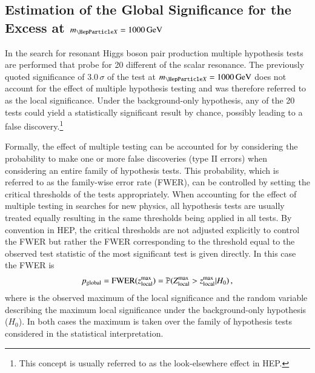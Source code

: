 

\subsection{Estimation of the Global Significance for the Excess at
  $\mX = \SI{1000}{\GeV}$}%
\label{sec:global_significance}


In the search for resonant Higgs boson pair production multiple hypothesis tests
are performed that probe for 20 different \mX of the scalar resonance. The
previously quoted significance of $3.0\,\sigma$ of the test at
$\mX = \SI{1000}{\GeV}$ does not account for the effect of multiple hypothesis
testing and was therefore referred to as the local significance. Under the
background-only hypothesis, any of the 20 tests could yield a statistically
significant result by chance, possibly leading to a false
discovery.\footnote{This concept is usually referred to as the look-elsewhere
  effect in HEP.}

Formally, the effect of multiple testing can be accounted for by considering the
probability to make one or more false discoveries (type II errors) when
considering an entire family of hypothesis tests.
This probability, which is referred to as the family-wise error rate (FWER), can
be controlled by setting the critical thresholds of the tests
appropriately. When accounting for the effect of multiple testing in searches
for new physics, all hypothesis tests are usually treated equally resulting in
the same thresholds being applied in all tests. By convention in HEP, the
critical thresholds are not adjusted explicitly to control the FWER but rather
the FWER corresponding to the threshold equal to the observed test statistic of
the most significant test is given directly. In this case the FWER is
\begin{align*}
  p_{\text{global}} = \text{FWER}(z_{\text{local}}^{\text{max}})
  = \mathbb{P}(Z_{\text{local}}^{\text{max}} > z_{\text{local}}^{\text{max}} \vert H_0)\,\text{,}
\end{align*}
where \zmaxlocal is the observed maximum of the local significance and
\Zmaxlocal the random variable describing the maximum local significance under
the background-only hypothesis ($H_0$). In both cases the maximum is taken over
the family of hypothesis tests considered in the statistical interpretation.

